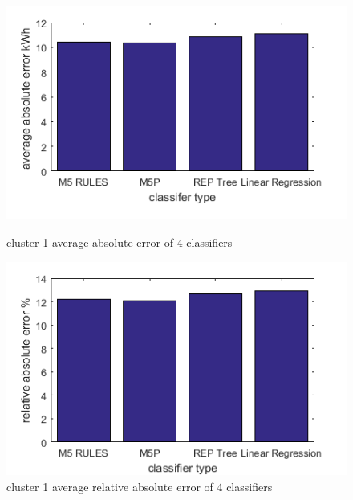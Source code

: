 \begin{figure}
\centering
\begin{minipage}{.5\textwidth}
  \centering
  \includegraphics[width=\linewidth]{cluster-1-diff-classifier-avg-abs.png}
  \caption{cluster 1 average absolute error of 4 classifiers}
  \label{fig:cluster-1-predictors}
\end{minipage}%
\begin{minipage}{.5\textwidth}
  \centering
  \includegraphics[width=\linewidth]{cluster-1-diff-classifier-relative-abs.png}
  \caption{cluster 1 average relative absolute error of 4 classifiers}
\end{minipage}

\end{figure}

